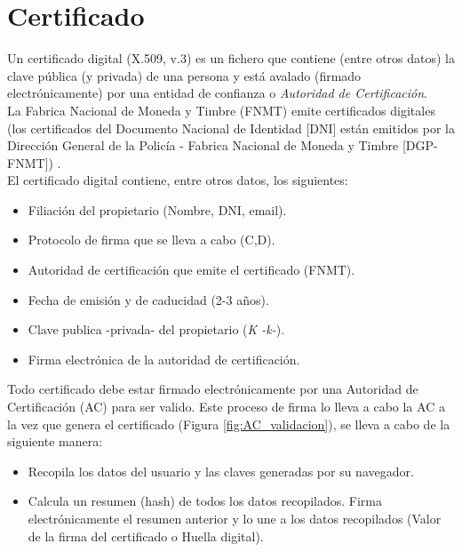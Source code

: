 \documentclass[12pt, a4paper, titlepage]{report}
\begin{document}
        \section{Certificado}
        Un certificado digital (X.509, v.3) es un fichero que contiene (entre otros datos) la clave pública (y privada) de una persona y está avalado (firmado electrónicamente) por una entidad de confianza o \textit{Autoridad de Certificación}.\\
        La Fabrica Nacional de Moneda y Timbre (FNMT) emite certificados digitales (los certificados del Documento Nacional de Identidad [DNI]  están emitidos por la Dirección General de la Policía - Fabrica Nacional de Moneda y Timbre [DGP-FNMT]) \cite{refCertificadosElectronicos}.\\
        El certificado digital contiene, entre otros datos, los siguientes:
        \begin{itemize}
            \item Filiación del propietario (Nombre, DNI, email).
            \item Protocolo de firma que se lleva a cabo (C,D).
            \item Autoridad de certificación que emite el certificado (FNMT).
            \item Fecha de emisión y de caducidad (2-3 años).
            \item Clave publica -privada- del propietario (\textit{K -k-}).
            \item Firma electrónica de la autoridad de certificación.
        \end{itemize}
        
        Todo certificado debe estar firmado electrónicamente por una Autoridad de Certificación (AC) para ser valido.
        Este proceso de firma lo lleva a cabo la AC a la vez que genera el certificado (Figura  \ref{fig:AC_validacion}), se lleva a cabo de la siguiente manera:
        \begin{itemize}
            \item Recopila los datos del usuario y las claves generadas por su navegador.
            \item Calcula un resumen (hash) de todos los datos recopilados.
            Firma electrónicamente el resumen anterior y lo une a los datos recopilados (Valor de la firma del certificado o Huella digital).
        \end{itemize}
        
\end{document}
